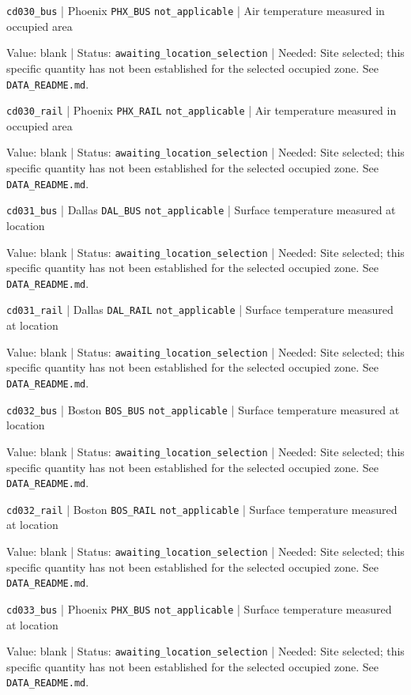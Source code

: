 \nolinkurl{cd030_bus} | Phoenix \nolinkurl{PHX_BUS} \nolinkurl{not_applicable} | Air temperature measured in occupied area

Value: blank | Status: \nolinkurl{awaiting_location_selection} | Needed: Site selected; this specific quantity has not been established for the selected occupied zone. See \nolinkurl{DATA_README.md}.

\nolinkurl{cd030_rail} | Phoenix \nolinkurl{PHX_RAIL} \nolinkurl{not_applicable} | Air temperature measured in occupied area

Value: blank | Status: \nolinkurl{awaiting_location_selection} | Needed: Site selected; this specific quantity has not been established for the selected occupied zone. See \nolinkurl{DATA_README.md}.

\nolinkurl{cd031_bus} | Dallas \nolinkurl{DAL_BUS} \nolinkurl{not_applicable} | Surface temperature measured at location

Value: blank | Status: \nolinkurl{awaiting_location_selection} | Needed: Site selected; this specific quantity has not been established for the selected occupied zone. See \nolinkurl{DATA_README.md}.

\nolinkurl{cd031_rail} | Dallas \nolinkurl{DAL_RAIL} \nolinkurl{not_applicable} | Surface temperature measured at location

Value: blank | Status: \nolinkurl{awaiting_location_selection} | Needed: Site selected; this specific quantity has not been established for the selected occupied zone. See \nolinkurl{DATA_README.md}.

\nolinkurl{cd032_bus} | Boston \nolinkurl{BOS_BUS} \nolinkurl{not_applicable} | Surface temperature measured at location

Value: blank | Status: \nolinkurl{awaiting_location_selection} | Needed: Site selected; this specific quantity has not been established for the selected occupied zone. See \nolinkurl{DATA_README.md}.

\nolinkurl{cd032_rail} | Boston \nolinkurl{BOS_RAIL} \nolinkurl{not_applicable} | Surface temperature measured at location

Value: blank | Status: \nolinkurl{awaiting_location_selection} | Needed: Site selected; this specific quantity has not been established for the selected occupied zone. See \nolinkurl{DATA_README.md}.

\nolinkurl{cd033_bus} | Phoenix \nolinkurl{PHX_BUS} \nolinkurl{not_applicable} | Surface temperature measured at location

Value: blank | Status: \nolinkurl{awaiting_location_selection} | Needed: Site selected; this specific quantity has not been established for the selected occupied zone. See \nolinkurl{DATA_README.md}.

